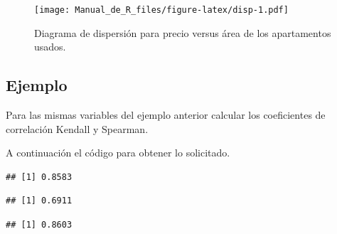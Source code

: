 \documentclass[10pt,]{krantz}
\makeatletter
\newenvironment{Shaded}{\begin{snugshade}}{\end{snugshade}}
\newcommand{\KeywordTok}[1]{\textcolor[rgb]{0.13,0.29,0.53}{\textbf{{#1}}}}
\newcommand{\DataTypeTok}[1]{\textcolor[rgb]{0.13,0.29,0.53}{{#1}}}
\newcommand{\StringTok}[1]{\textcolor[rgb]{0.31,0.60,0.02}{{#1}}}
\newcommand{\NormalTok}[1]{{#1}}
\newenvironment{kframe}{%
\medskip{}
\setlength{\fboxsep}{.8em}
 \def\at@end@of@kframe{}%
 \ifinner\ifhmode%
  \def\at@end@of@kframe{\end{minipage}}%
  \begin{minipage}{\columnwidth}%
 \fi\fi%
 \def\FrameCommand##1{\hskip\@totalleftmargin \hskip-\fboxsep
 \colorbox{shadecolor}{##1}\hskip-\fboxsep
     \hskip-\linewidth \hskip-\@totalleftmargin \hskip\columnwidth}%
 \MakeFramed {\advance\hsize-\width
   \@totalleftmargin\z@ \linewidth\hsize
   \@setminipage}}%
 {\par\unskip\endMakeFramed%
 \at@end@of@kframe}
\renewenvironment{Shaded}{\begin{kframe}}{\end{kframe}}
\makeatother
\begin{document}
\begin{figure}[htbp]
\centering
\texttt{[image: Manual\_de\_R\_files/figure-latex/disp-1.pdf]}
\caption{\label{fig:disp}Diagrama de dispersión para precio versus área de
los apartamentos usados.}
\end{figure}

\subsection*{Ejemplo}\label{ejemplo-44}


Para las mismas variables del ejemplo anterior calcular los coeficientes
de correlación Kendall y Spearman.

A continuación el código para obtener lo solicitado.

\begin{Shaded}
\end{Shaded}

\begin{verbatim}
## [1] 0.8583
\end{verbatim}

\begin{Shaded}
\end{Shaded}

\begin{verbatim}
## [1] 0.6911
\end{verbatim}

\begin{Shaded}
\end{Shaded}

\begin{verbatim}
## [1] 0.8603
\end{verbatim}
\end{document}
